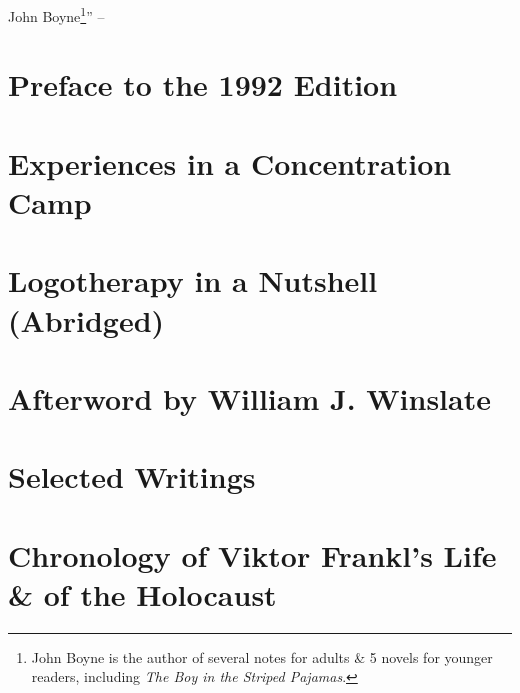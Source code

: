 \documentclass{article}
\numberwithin{equation}{section}
\begin{document}
John Boyne\footnote{John Boyne is the author of several notes for adults \& 5 novels for younger readers, including \textit{The Boy in the Striped Pajamas}.}'' -- \cite[pp. 6--8]{Frankl2017}


\section*{Preface to the 1992 Edition}


\section{Experiences in a Concentration Camp}


\section{Logotherapy in a Nutshell (Abridged)}


\section{Afterword by William J. Winslate}


\section{Selected Writings}


\section{Chronology of Viktor Frankl's Life \& of the Holocaust}


\printbibliography[heading=bibintoc]
	
\end{document}
